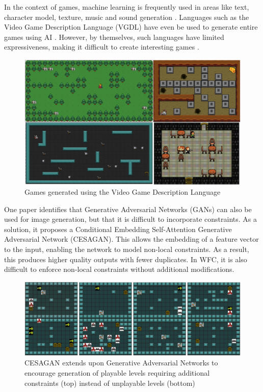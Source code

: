 In the context of games, machine learning is frequently used in areas like text, character model, texture, music and sound generation \cite{DeepLearningPCG}. Languages such as the Video Game Description Language (VGDL) have even be used to generate entire games using AI \cite{VGDL, VGDL_ASP}. However, by themselves, such languages have limited expressiveness, making it difficult to create interesting games \cite{VGDL}.

\begin{figure}[H]
    \centering
    \includegraphics[width=\textwidth, height=0.3\textheight, keepaspectratio]{Images/VGDL.jpg}
    \caption{Games generated using the Video Game Description Language \cite{VGDL}}
    \label{fig:vgdl}
\end{figure}

One paper \cite{CESAGAN} identifies that Generative Adversarial Networks (GANs) can also be used for image generation, but that it is difficult to incorporate constraints. As a solution, it proposes a Conditional Embedding Self-Attention Generative Adversarial Network (CESAGAN). This allows the embedding of a feature vector to the input, enabling the network to model non-local constraints. As a result, this produces higher quality outputs with fewer duplicates. In WFC, it is also difficult to enforce non-local constraints without additional modifications.

\begin{figure}[H]
    \centering
    \includegraphics[width=\textwidth, height=0.3\textheight, keepaspectratio]{Images/CESAGAN.jpg}
    \caption{CESAGAN extends upon Generative Adversarial Networks to encourage generation of playable levels requiring additional constraints (top) instead of unplayable levels (bottom) \cite{CESAGAN}}
    \label{fig:cesagan}
\end{figure}


